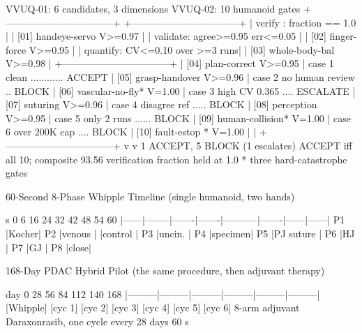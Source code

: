 \begin{asciifig}
VVUQ-01: 6 candidates, 3 dimensions   VVUQ-02: 10 humanoid gates
+---------------------------------+   +---------------------------------+
| verify  : fraction == 1.0       |   | [01] handeye-servo    V>=0.97   |
| validate: agree>=0.95 err<=0.05 |   | [02] finger-force     V>=0.95   |
| quantify: CV<=0.10 over >=3 runs|   | [03] whole-body-bal   V>=0.98   |
+---------------------------------+   | [04] plan-correct     V>=0.95   |
 case 1 clean ............ ACCEPT     | [05] grasp-handover   V>=0.96   |
 case 2 no human review .. BLOCK      | [06] vascular-no-fly* V=1.00    |
 case 3 high CV 0.365 .... ESCALATE   | [07] suturing         V>=0.96   |
 case 4 disagree ref ..... BLOCK      | [08] perception       V>=0.95   |
 case 5 only 2 runs ...... BLOCK      | [09] human-collision* V=1.00    |
 case 6 over 200K cap .... BLOCK      | [10] fault-estop    * V=1.00    |
          |                           +---------------------------------+
          v                                     v
 1 ACCEPT, 5 BLOCK (1 escalates)       ACCEPT iff all 10; composite 93.56
 verification fraction held at 1.0     * three hard-catastrophe gates
\end{asciifig}


\begin{asciifig}
60-Second 8-Phase Whipple Timeline (single humanoid, two hands)

  s  0      6        16      24      32          42      48     54     60
     |------|--------|-------|-------|-----------|-------|------|------|
  P1 |Kocher|
  P2        |venous  |
            |control |
  P3                 |uncin. |
  P4                         |specimen|
  P5                                  |PJ suture  |
  P6                                              |HJ     |
  P7                                                      |GJ    |
  P8                                                             |close|

168-Day PDAC Hybrid Pilot (the same procedure, then adjuvant therapy)

  day 0        28        56        84       112       140       168
   |---------|---------|---------|---------|---------|---------|
   [Whipple]  [cyc 1]   [cyc 2]   [cyc 3]   [cyc 4]   [cyc 5]   [cyc 6]
   8-arm      adjuvant Daraxonrasib, one cycle every 28 days
   60 s
\end{asciifig}

